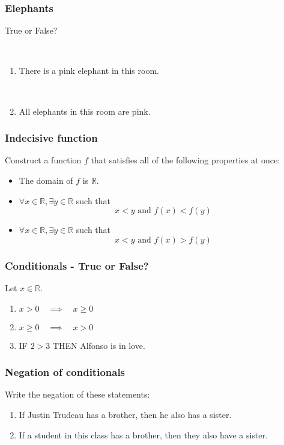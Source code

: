 \documentclass[14pt]{beamer}
\newcommand {\DS} [1] {${\displaystyle #1}$}
\newcommand {\R}{\mathbb{R}}
\newcommand{\p}{\pause}
\begin{document}
\begin{frame}
\frametitle{Elephants}

True or False?

\

\begin{enumerate}
	\item  There is a pink elephant in this room.

\

	\item  All elephants in this room are pink.
\end{enumerate}

\end{frame}
\begin{frame}
\frametitle{Indecisive function}

Construct a function $f$ that satisfies all of the following properties at once:
	\begin{itemize}
		\item  The domain of $f$ is $\R$.
		\item  \DS{\forall x \in \R, \exists y \in \R} such that
			$$  x<y \mbox{ and } f(x) < f(y) $$
		\item  \DS{\forall x \in \R, \exists y \in \R} such that
			$$  x<y \mbox{ and } f(x) > f(y) $$
	\end{itemize}

\end{frame}

\begin{frame}
\frametitle{ Conditionals - True or False?}


Let \DS{x \in \R}.  

	\begin{enumerate}
		\item \DS{x > 0 \quad \implies \quad x \geq 0}
		\item \DS{x \geq 0 \quad \implies \quad x > 0}
		
		\vfill \p
		
		\item IF \DS{2 > 3}  THEN Alfonso is in love.
	\end{enumerate}

\vfill

\end{frame}

\begin{frame}
\frametitle{Negation of conditionals}

Write the negation of these statements:
	\begin{enumerate}
		\item  If Justin Trudeau has a brother, then he also has a sister.
		\item  If a student in this class has a brother, then they also have a sister.
	\end{enumerate}	
\end{frame}
\end{document}
